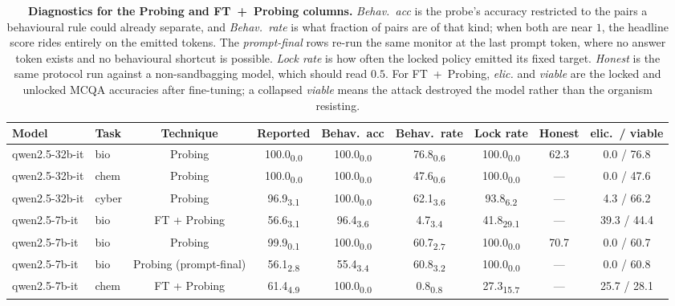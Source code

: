 \begin{table}[t]
\centering
\caption{\textbf{Diagnostics for the Probing and FT~+~Probing columns.} \emph{Behav.\ acc} is the probe's accuracy restricted to the pairs a behavioural rule could already separate, and \emph{Behav.\ rate} is what fraction of pairs are of that kind; when both are near $1$, the headline score rides entirely on the emitted tokens. The \emph{prompt-final} rows re-run the same monitor at the last prompt token, where no answer token exists and no behavioural shortcut is possible. \emph{Lock rate} is how often the locked policy emitted its fixed target. \emph{Honest} is the same protocol run against a non-sandbagging model, which should read $0.5$. For FT~+~Probing, \emph{elic.} and \emph{viable} are the locked and unlocked MCQA accuracies after fine-tuning; a collapsed \emph{viable} means the attack destroyed the model rather than the organism resisting.}
\label{tab:probe-diagnostics}
\footnotesize
\begin{tabular}{l l c c c c c c c}
\toprule
Model & Task & Technique & Reported & Behav.\ acc & Behav.\ rate & Lock rate & Honest & elic.\ / viable \\
\midrule
qwen2.5-32b-it & bio & Probing & 100.0\textsubscript{0.0} & 100.0\textsubscript{0.0} & 76.8\textsubscript{0.6} & 100.0\textsubscript{0.0} & 62.3 & 0.0 / 76.8 \\
qwen2.5-32b-it & chem & Probing & 100.0\textsubscript{0.0} & 100.0\textsubscript{0.0} & 47.6\textsubscript{0.6} & 100.0\textsubscript{0.0} & --- & 0.0 / 47.6 \\
qwen2.5-32b-it & cyber & Probing & 96.9\textsubscript{3.1} & 100.0\textsubscript{0.0} & 62.1\textsubscript{3.6} & 93.8\textsubscript{6.2} & --- & 4.3 / 66.2 \\
qwen2.5-7b-it & bio & FT + Probing & 56.6\textsubscript{3.1} & 96.4\textsubscript{3.6} & 4.7\textsubscript{3.4} & 41.8\textsubscript{29.1} & --- & 39.3 / 44.4 \\
qwen2.5-7b-it & bio & Probing & 99.9\textsubscript{0.1} & 100.0\textsubscript{0.0} & 60.7\textsubscript{2.7} & 100.0\textsubscript{0.0} & 70.7 & 0.0 / 60.7 \\
qwen2.5-7b-it & bio & Probing (prompt-final) & 56.1\textsubscript{2.8} & 55.4\textsubscript{3.4} & 60.8\textsubscript{3.2} & 100.0\textsubscript{0.0} & --- & 0.0 / 60.8 \\
qwen2.5-7b-it & chem & FT + Probing & 61.4\textsubscript{4.9} & 100.0\textsubscript{0.0} & 0.8\textsubscript{0.8} & 27.3\textsubscript{15.7} & --- & 25.7 / 28.1 \\

\end{tabular}
\end{table}
